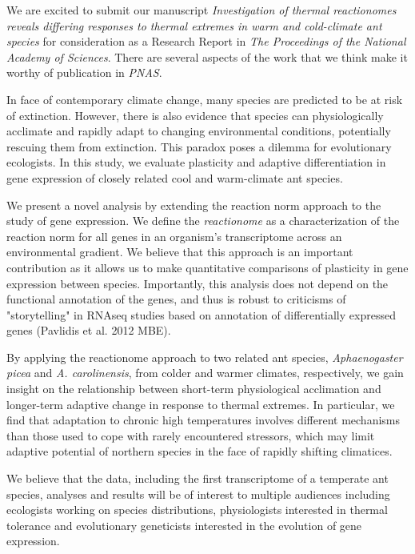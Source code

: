 \documentclass[letterpaper]{article}
\begin{document}
\thispagestyle{first}


We are excited to submit our manuscript \emph{Investigation of thermal
reactionomes reveals differing responses to thermal extremes in warm and
cold-climate ant species} for consideration as a Research Report in
\emph{The Proceedings of the National Academy of Sciences}. There are
several aspects of the work that we think make it worthy of publication
in \emph{PNAS}.

In face of contemporary climate change, many species are predicted to be at 
risk of extinction. However, there is also evidence that species can physiologically
acclimate and rapidly adapt to changing environmental conditions, potentially
rescuing them from extinction. This paradox poses a dilemma for evolutionary
ecologists. In this study, we evaluate plasticity and adaptive differentiation
in gene expression of closely related cool and warm-climate ant species.

We present a novel analysis by extending the reaction
norm approach to the study of gene expression. We define the
\emph{reactionome} as a characterization of the reaction norm for all
genes in an organism's transcriptome across an environmental gradient. 
We believe that this approach is an important contribution as it allows us
to make quantitative comparisons of plasticity in gene expression between
species. Importantly, this analysis does not depend on the functional 
annotation of the genes, and thus is robust to criticisms of "storytelling" 
in RNAseq studies based on annotation of differentially expressed 
genes (Pavlidis et al. 2012 MBE). 

By applying the reactionome approach to two related ant species,
\emph{Aphaenogaster picea} and \emph{A. carolinensis}, from colder and
warmer climates, respectively, we gain insight on the relationship
between short-term physiological acclimation and longer-term adaptive
change in response to thermal extremes. In particular, we find that
adaptation to chronic high temperatures involves different mechanisms
than those used to cope with rarely encountered stressors, which may
limit adaptive potential of northern species in the face of rapidly
shifting climatices.

We believe that the data, including the first transcriptome of a
temperate ant species, analyses and results will be of interest to
multiple audiences including ecologists working on species
distributions, physiologists interested in thermal tolerance and
evolutionary geneticists interested in the evolution of gene expression.
\end{document}
